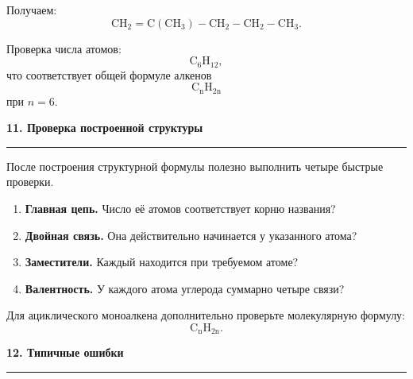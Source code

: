 \documentclass[a4paper,12pt]{article}
\newcommand{\lessonsection}[1]{%
    \vspace{0.7em}
    {\Large\bfseries\color{darkaccent}#1}\par
    \vspace{0.15em}
    {\color{linegray}\rule{\linewidth}{0.7pt}}
    \vspace{0.35em}
}
\newcommand{\important}[1]{\textbf{\color{darkaccent}#1}}
\begin{document}
Получаем:
\[
\boxed{\mathrm{CH_2=C(CH_3)-CH_2-CH_2-CH_3}.}
\]

Проверка числа атомов:
\[
\mathrm{C_6H_{12}},
\]
что соответствует общей формуле алкенов
\[
\mathrm{C_nH_{2n}}
\]
при \(n=6\).


\lessonsection{11. Проверка построенной структуры}

После построения структурной формулы полезно выполнить четыре быстрые проверки.

\begin{enumerate}
    \item \important{Главная цепь.} Число её атомов соответствует корню названия?
    \item \important{Двойная связь.} Она действительно начинается у указанного атома?
    \item \important{Заместители.} Каждый находится при требуемом атоме?
    \item \important{Валентность.} У каждого атома углерода суммарно четыре связи?
\end{enumerate}

Для ациклического моноалкена дополнительно проверьте молекулярную формулу:
\[
\boxed{\mathrm{C_nH_{2n}}.}
\]


\lessonsection{12. Типичные ошибки}
\end{document}

